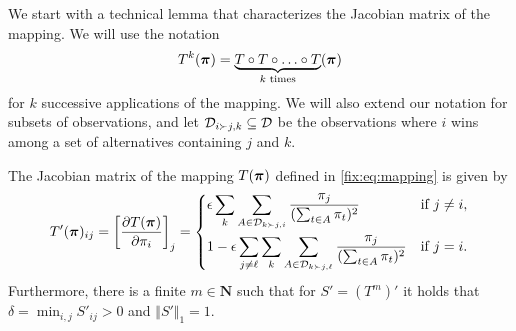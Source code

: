 We start with a technical lemma that characterizes the Jacobian matrix of the mapping.
We will use the notation
\begin{align}
T^k(\bm{\pi}) = \underbrace{T \circ T \circ \ldots \circ T}_{\text{$k$ times}}(\bm{\pi})
\end{align}
for $k$ successive applications of the mapping.
We will also extend our notation for subsets of observations, and let $\mathcal{D}_{i \succ j,k} \subseteq \mathcal{D}$ be the observations where $i$ wins among a set of alternatives containing $j$ and $k$.
\begin{lemma}
\label{fix:lem:jacobian}
The Jacobian matrix of the mapping $T(\bm{\pi})$ defined in \eqref{fix:eq:mapping} is given by
\begin{align}
T'(\bm{\pi})_{ij} = \left[ \frac{\partial T(\bm{\pi})}{\partial \pi_i} \right]_j =
\begin{dcases}
\epsilon \sum_{k} \sum_{A \in \mathcal{D}_{k \succ j,i}} \frac{\pi_j}{(\sum_{t \in A} \pi_t)^2}                          & \text{if } j \ne i, \\
1 - \epsilon \sum_{j \ne \ell} \sum_{k} \sum_{A \in \mathcal{D}_{k \succ j,\ell}} \frac{\pi_j}{(\sum_{t \in A} \pi_t)^2} & \text{if } j = i.
\end{dcases}
\end{align}
Furthermore, there is a finite $m \in \mathbf{N}$ such that for $S' = (T^m)'$ it holds that $\delta = \min_{i,j} S'_{ij} > 0$ and $\Vert S' \Vert_1 = 1$.
\end{lemma}


